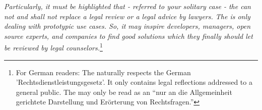 \textit{Particularly, it must be highlighted that - referred to your solitary
case - the \oslic{} can not and shall not replace a legal review or a legal advice
by lawyers. The \oslic{} is only dealing with prototypic use cases. So, it may
inspire developers, managers, open source experts, and companies to find good
solutions which they finally should let be reviewed by legal
counselors.}\footnote{For German readers: The \oslic{} naturally respects the German
'Rechtsdienstleistungsgesetz'. It only contains legal reflections addressed to a
general public. The \oslic{} may only be read as an \enquote{nur an die
Allgemeinheit gerichtete Darstellung und Erörterung von Rechtsfragen.}}



